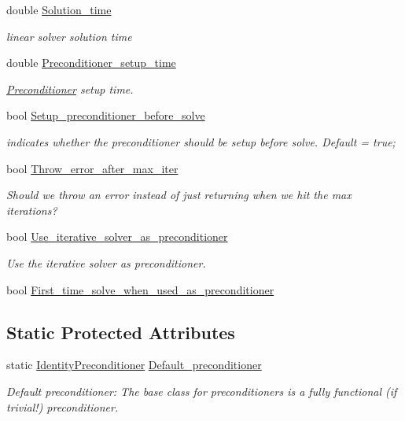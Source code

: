 \begin{DoxyCompactItemize}
double \hyperlink{classoomph_1_1IterativeLinearSolver_ab90d7e7780e709946dd0540a146186b5}{Solution\+\_\+time}
\begin{DoxyCompactList}\small\item\em linear solver solution time \end{DoxyCompactList}\item 
double \hyperlink{classoomph_1_1IterativeLinearSolver_a8022e90c9c7c720a0bacf9d090c81a10}{Preconditioner\+\_\+setup\+\_\+time}
\begin{DoxyCompactList}\small\item\em \hyperlink{classoomph_1_1Preconditioner}{Preconditioner} setup time. \end{DoxyCompactList}\item 
bool \hyperlink{classoomph_1_1IterativeLinearSolver_af0344cc8a3a850f160973f1d44bf20f2}{Setup\+\_\+preconditioner\+\_\+before\+\_\+solve}
\begin{DoxyCompactList}\small\item\em indicates whether the preconditioner should be setup before solve. Default = true; \end{DoxyCompactList}\item 
bool \hyperlink{classoomph_1_1IterativeLinearSolver_a76284ada37aafb9ab39836907569c7b2}{Throw\+\_\+error\+\_\+after\+\_\+max\+\_\+iter}
\begin{DoxyCompactList}\small\item\em Should we throw an error instead of just returning when we hit the max iterations? \end{DoxyCompactList}\item 
bool \hyperlink{classoomph_1_1IterativeLinearSolver_a10af0af774e98543b7ecd6a563018ff8}{Use\+\_\+iterative\+\_\+solver\+\_\+as\+\_\+preconditioner}
\begin{DoxyCompactList}\small\item\em Use the iterative solver as preconditioner. \end{DoxyCompactList}\item 
bool \hyperlink{classoomph_1_1IterativeLinearSolver_a18f24e4d07f783ddd1f6a8153f39024a}{First\+\_\+time\+\_\+solve\+\_\+when\+\_\+used\+\_\+as\+\_\+preconditioner}
\end{DoxyCompactItemize}
\subsection*{Static Protected Attributes}
\begin{DoxyCompactItemize}
\item 
static \hyperlink{classoomph_1_1IdentityPreconditioner}{Identity\+Preconditioner} \hyperlink{classoomph_1_1IterativeLinearSolver_a8393d99578cbee0fdb937ddec34be74c}{Default\+\_\+preconditioner}
\begin{DoxyCompactList}\small\item\em Default preconditioner\+: The base class for preconditioners is a fully functional (if trivial!) preconditioner. \end{DoxyCompactList}\end{DoxyCompactItemize}
